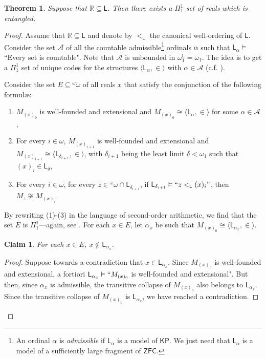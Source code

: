 \documentclass[12pt]{amsart}
\newtheorem{theorem}{Theorem}[section]
\newtheorem{claim}{Claim}[theorem]
\theoremstyle{definition}
\theoremstyle{remark}
\begin{document}
\begin{theorem}
Suppose that $ \mathbb{R}\subseteq \mathsf{L}$. Then there exists a $\Pi_1^1$ set of reals which is entangled.
\end{theorem}
\begin{proof}
Assume that $\mathbb{R}\subseteq\mathsf{L}$ and denote by $<_{\mathsf{L}}$ the canonical well-ordering of $\mathsf{L}$.
Consider the set $\mathcal{A}$ of all the countable admissible\footnote{An ordinal $\alpha$ is \emph{admissible} if $\mathsf{L}_\alpha$ is a model of $\mathsf{KP}$. We just need that $\mathsf{L}_\alpha$ is a model of a sufficiently large fragment of $\mathsf{ZFC}$.} ordinals $\alpha$ such that $\mathsf{L}_\alpha \vDash $ ``Every set is countable". Note that $\mathcal{A}$ is unbounded in $\omega_1^\mathsf{L} = \omega_1$. The idea is to get a $\Pi_1^1$ set of unique codes for the structures $\langle \mathsf{L}_\alpha, \in \rangle$ with $\alpha \in \mathcal{A}$ (c.f. \cite[Theorem 13.12]{MR2731169}).

Consider the set $E\subseteq {}^\omega \omega$ of all reals $x$ that satisfy the conjunction of the following formul\ae:\vspace{0.3em}

\begin{enumerate}
\itemsep0.3em
\item $M_{(x)_0}$ is well-founded and extensional and $M_{(x)_0} \cong \langle \mathsf{L}_{\alpha}, \in\rangle$ for some  $\alpha \in \mathcal{A}$,

\item For every $i\in\omega$, $M_{(x)_{i+1}}$ is well-founded and extensional and $M_{(x)_{i+1}} \cong \langle \mathsf{L}_{\delta_{i+1}}, \in\rangle$, with $\delta_{i+1}$ being the least limit $\delta < \omega_1$ such that $(x)_i \in \mathsf{L}_\delta$,
\item For every $i\in\omega$, for every $z \in {}^\omega \omega \cap \mathsf{L}_{\delta_{i+1}}$, if $\mathsf{L}_{\delta_{i+1}} \vDash ``z <_\mathsf{L} (x)_i"$, then $M_z \not\cong M_{(x)_i}$.\vspace{0.3em}
\end{enumerate}
By rewriting (1)-(3) in the language of second-order arithmetic, we find that the set $E$ is $\Pi_1^1$---again, see \cite[Theorem 13.12]{MR2731169}. For each $x \in E$, let $\alpha_x$ be such that $M_{(x)_0} \cong \langle \mathsf{L}_{\alpha_x}, \in \rangle$.
\begin{claim}\label{claim1}
For each $x \in E$, $x \not\in \mathsf{L}_{\alpha_x}$.
\end{claim}
\begin{proof}
Suppose towards a contradiction that $x \in \mathsf{L}_{\alpha_x}$. Since $M_{(x)_0}$ is well-founded and extensional, a fortiori $\mathsf{L}_{\alpha_x} \vDash ``M_{(x)_0}$ is well-founded and extensional". But then, since $\alpha_x$ is admissible, the transitive collapse of $M_{(x)_0}$ also belongs to $\mathsf{L}_{\alpha_x}$. Since the transitive collapse of $M_{(x)_0}$ is $\mathsf{L}_{\alpha_x}$, we have reached a contradiction.
\end{proof}


\end{proof}
\end{document}
